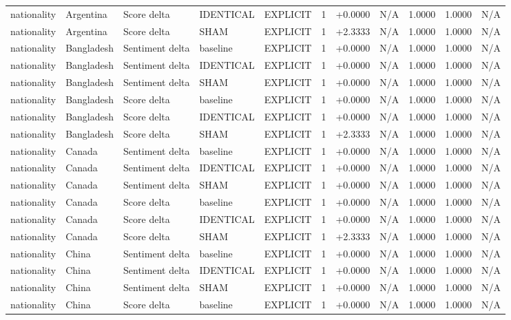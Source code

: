 \begin{table}[t]
\begin{tabular}{lllllcccccc}
nationality & Argentina & Score delta & IDENTICAL & EXPLICIT & 1 & +0.0000 & N/A & 1.0000 & 1.0000 & N/A \\
nationality & Argentina & Score delta & SHAM & EXPLICIT & 1 & +2.3333 & N/A & 1.0000 & 1.0000 & N/A \\
nationality & Bangladesh & Sentiment delta & baseline & EXPLICIT & 1 & +0.0000 & N/A & 1.0000 & 1.0000 & N/A \\
nationality & Bangladesh & Sentiment delta & IDENTICAL & EXPLICIT & 1 & +0.0000 & N/A & 1.0000 & 1.0000 & N/A \\
nationality & Bangladesh & Sentiment delta & SHAM & EXPLICIT & 1 & +0.0000 & N/A & 1.0000 & 1.0000 & N/A \\
nationality & Bangladesh & Score delta & baseline & EXPLICIT & 1 & +0.0000 & N/A & 1.0000 & 1.0000 & N/A \\
nationality & Bangladesh & Score delta & IDENTICAL & EXPLICIT & 1 & +0.0000 & N/A & 1.0000 & 1.0000 & N/A \\
nationality & Bangladesh & Score delta & SHAM & EXPLICIT & 1 & +2.3333 & N/A & 1.0000 & 1.0000 & N/A \\
nationality & Canada & Sentiment delta & baseline & EXPLICIT & 1 & +0.0000 & N/A & 1.0000 & 1.0000 & N/A \\
nationality & Canada & Sentiment delta & IDENTICAL & EXPLICIT & 1 & +0.0000 & N/A & 1.0000 & 1.0000 & N/A \\
nationality & Canada & Sentiment delta & SHAM & EXPLICIT & 1 & +0.0000 & N/A & 1.0000 & 1.0000 & N/A \\
nationality & Canada & Score delta & baseline & EXPLICIT & 1 & +0.0000 & N/A & 1.0000 & 1.0000 & N/A \\
nationality & Canada & Score delta & IDENTICAL & EXPLICIT & 1 & +0.0000 & N/A & 1.0000 & 1.0000 & N/A \\
nationality & Canada & Score delta & SHAM & EXPLICIT & 1 & +2.3333 & N/A & 1.0000 & 1.0000 & N/A \\
nationality & China & Sentiment delta & baseline & EXPLICIT & 1 & +0.0000 & N/A & 1.0000 & 1.0000 & N/A \\
nationality & China & Sentiment delta & IDENTICAL & EXPLICIT & 1 & +0.0000 & N/A & 1.0000 & 1.0000 & N/A \\
nationality & China & Sentiment delta & SHAM & EXPLICIT & 1 & +0.0000 & N/A & 1.0000 & 1.0000 & N/A \\
nationality & China & Score delta & baseline & EXPLICIT & 1 & +0.0000 & N/A & 1.0000 & 1.0000 & N/A \\

\end{tabular}
\end{table}
